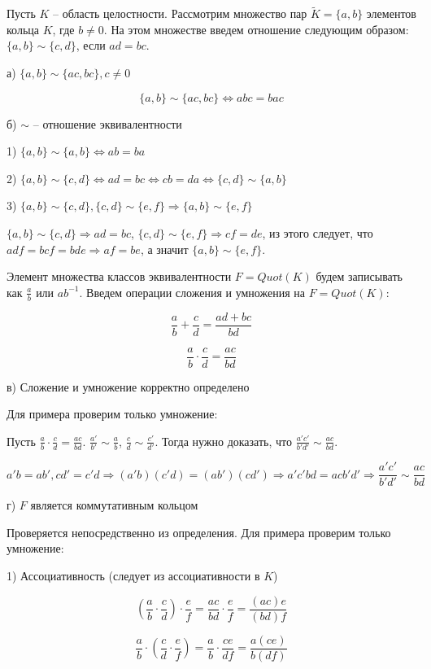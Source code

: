 Пусть $K$ -- область целостности. Рассмотрим множество пар  
$\widetilde{K} = \{a, b\}$ элементов кольца $K$, где $b \neq 0$. 
На этом множестве введем отношение следующим образом: 
$\{a, b\} \sim \{c, d\}$, если $ad = bc$.

а) $\{a, b\} \sim \{ac, bc\}, c\neq 0$

$$
\{a, b\} \sim \{ac, bc\} \Leftrightarrow abc = bac
$$

б) $\sim$ -- отношение эквивалентности

1) $\{a, b\} \sim \{a, b\} \Leftrightarrow ab = ba$

2) $\{a, b\} \sim \{c, d\} \Leftrightarrow ad = bc \Leftrightarrow
cb = da \Leftrightarrow \{c, d\} \sim \{a, b\}$

3) $\{a, b\} \sim \{c, d\}, \{c, d\} \sim \{e, f\} 
\Rightarrow \{a, b\} \sim \{e, f\}$

$\{a, b\} \sim \{c, d\} \Rightarrow ad = bc$,
$\{c, d\} \sim \{e, f\} \Rightarrow cf = de$, из этого следует, что
$adf = bcf = bde \Rightarrow af = be$, а значит
$\{a, b\} \sim \{e, f\}$.

Элемент множества классов эквивалентности $F = Quot(K)$ будем записывать как
$\frac{a}{b}$ или $ab^{-1}$. 
Введем операции сложения и умножения на $F = Quot(K)$:

$$
\frac{a}{b} + \frac{c}{d} = \frac{ad + bc}{bd}
$$

$$
\frac{a}{b} \cdot \frac{c}{d} = \frac{ac}{bd}
$$

в) Сложение и умножение корректно определено

Для примера проверим только умножение:

Пусть $\frac{a}{b} \cdot \frac{c}{d} = \frac{ac}{bd}$.
$\frac{a'}{b'} \sim \frac{a}{b}$,
$\frac{c}{d} \sim \frac{c'}{d'}$. Тогда нужно доказать, что
$\frac{a'c'}{b'd'} \sim \frac{ac}{bd}$.

$$
a'b = ab', cd' = c'd \Rightarrow
(a'b)(c'd) = (ab')(cd') \Rightarrow
a'c'bd = acb'd' \Rightarrow 
\frac{a'c'}{b'd'} \sim \frac{ac}{bd}
$$

г) $F$ является коммутативным кольцом

Проверяется непосредственно из определения.
Для примера проверим только умножение:

1) Ассоциативность (следует из ассоциативности в $K$)

$$
\left( \frac{a}{b} \cdot \frac{c}{d} \right) \cdot \frac{e}{f} =
\frac{ac}{bd} \cdot \frac{e}{f} = \frac{(ac)e}{(bd)f}
$$

$$
\frac{a}{b} \cdot \left( \frac{c}{d} \cdot \frac{e}{f} \right) =
\frac{a}{b} \cdot \frac{ce}{df} = \frac{a(ce)}{b(df)}
$$

